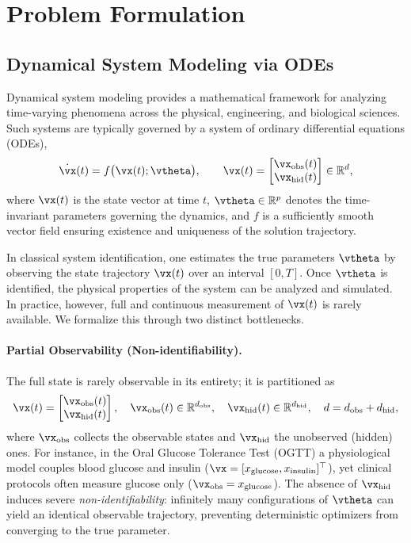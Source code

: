 \section{Problem Formulation}
\label{sec:problem}

\subsection{Dynamical System Modeling via ODEs}
Dynamical system modeling provides a mathematical framework for analyzing time-varying phenomena
across the physical, engineering, and biological sciences. Such systems are typically governed by
a system of ordinary differential equations (ODEs),
\begin{equation}
\label{eqn:ode}
    \dot{\vx}(t) = f\big(\vx(t); \vtheta\big), \qquad
    \vx(t) = \begin{bmatrix} \vx_{\mathrm{obs}}(t)\\ \vx_{\mathrm{hid}}(t)\end{bmatrix} \in \mathbb{R}^{d},
\end{equation}
where $\vx(t)$ is the state vector at time $t$, $\vtheta \in \mathbb{R}^{p}$ denotes the
time-invariant parameters governing the dynamics, and $f$ is a sufficiently smooth vector field
ensuring existence and uniqueness of the solution trajectory.

In classical system identification, one estimates the true parameters $\vtheta$ by observing the
state trajectory $\vx(t)$ over an interval $[0,T]$. Once $\vtheta$ is identified, the physical
properties of the system can be analyzed and simulated. In practice, however, full and continuous
measurement of $\vx(t)$ is rarely available. We formalize this through two distinct bottlenecks.

\paragraph{Partial Observability (Non-identifiability).}
The full state is rarely observable in its entirety; it is partitioned as
\begin{equation}
    \vx(t) = \begin{bmatrix} \vx_{\mathrm{obs}}(t) \\ \vx_{\mathrm{hid}}(t) \end{bmatrix},
    \quad \vx_{\mathrm{obs}}(t) \in \mathbb{R}^{d_{\mathrm{obs}}},
    \quad \vx_{\mathrm{hid}}(t) \in \mathbb{R}^{d_{\mathrm{hid}}},
    \quad d = d_{\mathrm{obs}} + d_{\mathrm{hid}},
\end{equation}
where $\vx_{\mathrm{obs}}$ collects the observable states and $\vx_{\mathrm{hid}}$ the unobserved
(hidden) ones. For instance, in the Oral Glucose Tolerance Test (OGTT) a physiological model
couples blood glucose and insulin ($\vx = [x_{\mathrm{glucose}}, x_{\mathrm{insulin}}]^\top$), yet
clinical protocols often measure glucose only ($\vx_{\mathrm{obs}} = x_{\mathrm{glucose}}$). The
absence of $\vx_{\mathrm{hid}}$ induces severe \textit{non-identifiability}: infinitely many
configurations of $\vtheta$ can yield an identical observable trajectory, preventing deterministic
optimizers from converging to the true parameter.


